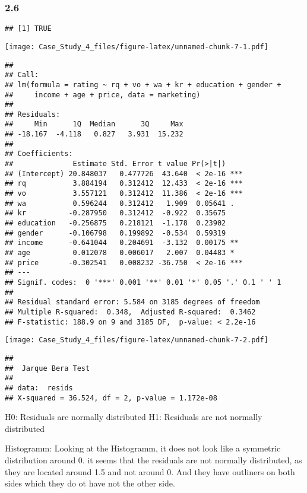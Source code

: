 \documentclass[
]{article}
\begin{document}
\hypertarget{section-6}{%
\subsubsection{2.6}\label{section-6}}

\begin{verbatim}
## [1] TRUE
\end{verbatim}

\texttt{[image: Case\_Study\_4\_files/figure-latex/unnamed-chunk-7-1.pdf]}

\begin{verbatim}
## 
## Call:
## lm(formula = rating ~ rq + vo + wa + kr + education + gender + 
##     income + age + price, data = marketing)
## 
## Residuals:
##     Min      1Q  Median      3Q     Max 
## -18.167  -4.118   0.827   3.931  15.232 
## 
## Coefficients:
##              Estimate Std. Error t value Pr(>|t|)    
## (Intercept) 20.848037   0.477726  43.640  < 2e-16 ***
## rq           3.884194   0.312412  12.433  < 2e-16 ***
## vo           3.557121   0.312412  11.386  < 2e-16 ***
## wa           0.596244   0.312412   1.909  0.05641 .  
## kr          -0.287950   0.312412  -0.922  0.35675    
## education   -0.256875   0.218121  -1.178  0.23902    
## gender      -0.106798   0.199892  -0.534  0.59319    
## income      -0.641044   0.204691  -3.132  0.00175 ** 
## age          0.012078   0.006017   2.007  0.04483 *  
## price       -0.302541   0.008232 -36.750  < 2e-16 ***
## ---
## Signif. codes:  0 '***' 0.001 '**' 0.01 '*' 0.05 '.' 0.1 ' ' 1
## 
## Residual standard error: 5.584 on 3185 degrees of freedom
## Multiple R-squared:  0.348,  Adjusted R-squared:  0.3462 
## F-statistic: 188.9 on 9 and 3185 DF,  p-value: < 2.2e-16
\end{verbatim}

\texttt{[image: Case\_Study\_4\_files/figure-latex/unnamed-chunk-7-2.pdf]}

\begin{verbatim}
## 
##  Jarque Bera Test
## 
## data:  resids
## X-squared = 36.524, df = 2, p-value = 1.172e-08
\end{verbatim}

H0: Residuals are normally distributed H1: Residuals are not normally
distributed

Histogramm: Looking at the Histogramm, it does not look like a symmetric
distribution around 0. it seems that the residuals are not normally
distributed, as they are located around 1.5 and not around 0. And they
have outliners on both sides which they do ot have not the other side.
\end{document}
